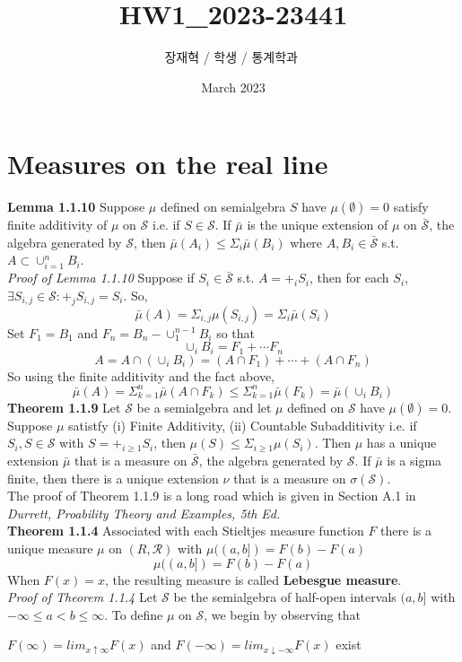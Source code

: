 \documentclass[10pt]{article}
\title{HW1_2023-23441}
\author{장재혁 / 학생 / 통계학과 ­}
\date{March 2023}
\begin{document}
\section*{Measures on the real line}
\textbf{Lemma 1.1.10} Suppose $\mu$ defined on semialgebra $S$ have $\mu(\emptyset)=0$ satisfy finite additivity of $\mu$ on $\mathcal{S}$ i.e. if $S \in \mathcal{S}$. If $\bar{\mu}$ is the unique extension of $\mu$ on $\bar{\mathcal{S}}$, the algebra generated by $\mathcal{S}$, then $\bar{\mu}(A_i) \leq \Sigma_i\bar{\mu}(B_i)$ where $A, B_i \in \bar{\mathcal{S}}$ s.t. $A \subset \cup_{i=1}^n B_i$.\\
\textit{Proof of Lemma 1.1.10} Suppose if $S_i \in \bar{\mathcal{S}}$ s.t. $A=+_iS_i$, then for each $S_i$, $\exists S_{i,j}\in\mathcal{S}: +_jS_{i,j}=S_i$. So,
$$\bar{\mu}(A)=\Sigma_{i,j}\mu(S_{i,j})=\Sigma_i\bar{\mu}(S_i)$$
Set $F_1=B_1$ and $F_n = B_n - \cup_1^{n-1}B_i$ so that 
$$\cup_i B_i = F_1 + \cdots F_n$$
$$A = A\cap(\cup_i B_i) = (A\cap F_1) + \cdots + (A\cap F_n)$$
So using the finite additivity and the fact above,
$$\bar{\mu}(A)=\Sigma_{k=1}^n\bar{\mu}(A\cap F_k) \leq \Sigma_{k=1}^n\bar{\mu}(F_k)=\bar{\mu}(\cup_i B_i)$$
\textbf{Theorem 1.1.9} Let $\mathcal{S}$ be a semialgebra and let $\mu$ defined on $\mathcal{S}$ have $\mu(\emptyset)=0$. Suppose $\mu$ satistfy (i) Finite Additivity, (ii) Countable Subadditivity i.e. if $S_i,S\in\mathcal{S}$ with $S=+_{i\geq1}S_i$, then $\mu(S)\leq\Sigma_{i\geq1}\mu(S_i)$. Then $\mu$ has a unique extension $\bar{\mu}$ that is a measure on $\bar{\mathcal{S}}$, the algebra generated by $\mathcal{S}$. If $\bar{\mu}$ is a sigma finite, then there is a unique extension $\nu$ that is a measure on $\sigma(\mathcal{S})$.\\
The proof of Theorem 1.1.9 is a long road which is given in Section A.1 in \textit{Durrett, Proability Theory and Examples, 5th Ed.}\\
\textbf{Theorem 1.1.4} Associated with each Stieltjes measure function $F$ there is a unique measure $\mu$ on $(R,\mathcal{R})$ with $\mu((a,b])=F(b)-F(a)$
\begin{equation}
    \mu((a,b])=F(b)-F(a)
\end{equation}
When $F(x)=x$, the resulting measure is called \textbf{Lebesgue measure}.\\
\textit{Proof of Theorem 1.1.4} Let $\mathcal{S}$ be the semialgebra of half-open intervals $(a,b]$ with $-\infty \leq a < b \leq \infty$. To define $\mu$ on $\mathcal{S}$, we begin by observing that 
\begin{center}
    $F(\infty)=lim_{x\uparrow \infty}F(x)$ and $F(-\infty)=lim_{x\downarrow -\infty}F(x)$ exist
\end{center}
\end{document}
